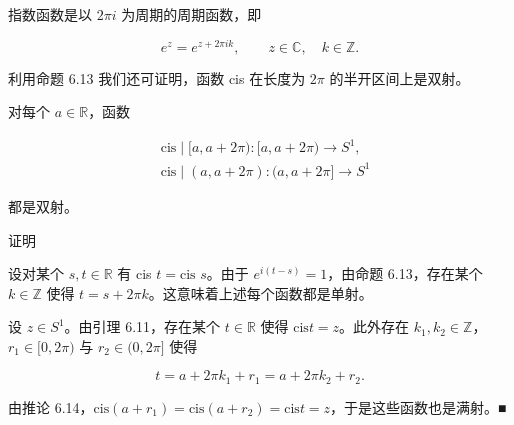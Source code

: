 \begin{corollary}

指数函数是以 $ 2\pi i $ 为周期的周期函数，即

\[
e^{z}=e^{z+2\pi i k},\qquad z\in\mathbb{C},\quad k\in\mathbb{Z}.
\]

利用命题 6.13 我们还可证明，函数 cis 在长度为 $ 2\pi $ 的半开区间上是双射。

\end{corollary}

\begin{proposition}

对每个 $ a \in \mathbb{R} $，函数

\begin{equation*}
\begin{aligned}
&\mathrm{cis}\mid[a,a+2\pi):[a,a+2\pi)\to S^{1},\\&\mathrm{cis}\mid(a,a+2\pi):(a,a+2\pi]\to S^{1}
\end{aligned}
\end{equation*}

都是双射。

证明

\begin{subitems}
\item

设对某个 $ s, t \in \mathbb{R} $ 有 cis $ t = \text{cis } s $。由于 $ e^{i(t-s)} = 1 $，由命题 6.13，存在某个 $ k \in \mathbb{Z} $ 使得 $ t = s + 2\pi k $。这意味着上述每个函数都是单射。

\item

设 $ z \in S^1 $。由引理 6.11，存在某个 $ t \in \mathbb{R} $ 使得 $ \mathrm{cis} t = z $。此外存在 $ k_1, k_2 \in \mathbb{Z} $，$ r_1 \in [0, 2\pi) $ 与 $ r_2 \in (0, 2\pi] $ 使得

\[
t=a+2\pi k_{1}+r_{1}=a+2\pi k_{2}+r_{2}.
\]

由推论 6.14，$ \mathrm{cis}(a+r_1)=\mathrm{cis}(a+r_2)=\mathrm{cis}t=z $，于是这些函数也是满射。■

\end{subitems}

\end{proposition}

